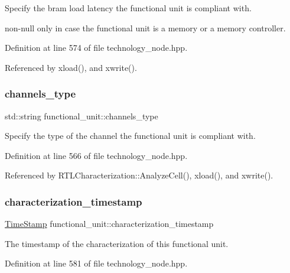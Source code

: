 Specify the bram load latency the functional unit is compliant with. 

non-\/null only in case the functional unit is a memory or a memory controller. 

Definition at line 574 of file technology\+\_\+node.\+hpp.



Referenced by xload(), and xwrite().

\mbox{\label{structfunctional__unit_a0c197e94ca77221ec1ce2b657ffd816a}} 
\subsubsection{\texorpdfstring{channels\+\_\+type}{channels\_type}}
{\footnotesize\ttfamily std\+::string functional\+\_\+unit\+::channels\+\_\+type}



Specify the type of the channel the functional unit is compliant with. 



Definition at line 566 of file technology\+\_\+node.\+hpp.



Referenced by R\+T\+L\+Characterization\+::\+Analyze\+Cell(), xload(), and xwrite().

\mbox{\label{structfunctional__unit_ab721a6dbc5f728621172d822d3589827}} 
\subsubsection{\texorpdfstring{characterization\+\_\+timestamp}{characterization\_timestamp}}
{\footnotesize\ttfamily \hyperlink{structTimeStamp}{Time\+Stamp} functional\+\_\+unit\+::characterization\+\_\+timestamp}



The timestamp of the characterization of this functional unit. 



Definition at line 581 of file technology\+\_\+node.\+hpp.




